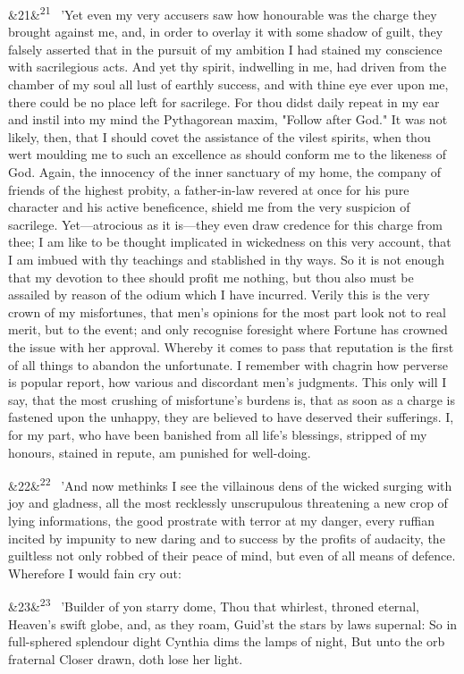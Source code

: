 \documentclass[12pt]{article}
\newcommand{\para}[1][]{\par\noindent\ifx&#1&\else\textsuperscript{\footnotesize #1}~\fi}
\begin{document}
\para[21] 'Yet even my very accusers saw how honourable was the charge they brought against me, and, in order to overlay it with some shadow of guilt, they falsely asserted that in the pursuit of my ambition I had stained my conscience with sacrilegious acts. And yet thy spirit, indwelling in me, had driven from the chamber of my soul all lust of earthly success, and with thine eye ever upon me, there could be no place left for sacrilege. For thou didst daily repeat in my ear and instil into my mind the Pythagorean maxim, "Follow after God." It was not likely, then, that I should covet the assistance of the vilest spirits, when thou wert moulding me to such an excellence as should conform me to the likeness of God. Again, the innocency of the inner sanctuary of my home, the company of friends of the highest probity, a father-in-law revered at once for his pure character and his active beneficence, shield me from the very suspicion of sacrilege. Yet---atrocious as it is---they even draw credence for this charge from thee; I am like to be thought implicated in wickedness on this very account, that I am imbued with thy teachings and stablished in thy ways. So it is not enough that my devotion to thee should profit me nothing, but thou also must be assailed by reason of the odium which I have incurred. Verily this is the very crown of my misfortunes, that men's opinions for the most part look not to real merit, but to the event; and only recognise foresight where Fortune has crowned the issue with her approval. Whereby it comes to pass that reputation is the first of all things to abandon the unfortunate. I remember with chagrin how perverse is popular report, how various and discordant men's judgments. This only will I say, that the most crushing of misfortune's burdens is, that as soon as a charge is fastened upon the unhappy, they are believed to have deserved their sufferings. I, for my part, who have been banished from all life's blessings, stripped of my honours, stained in repute, am punished for well-doing.

\para[22] 'And now methinks I see the villainous dens of the wicked surging with joy and gladness, all the most recklessly unscrupulous threatening a new crop of lying informations, the good prostrate with terror at my danger, every ruffian incited by impunity to new daring and to success by the profits of audacity, the guiltless not only robbed of their peace of mind, but even of all means of defence. Wherefore I would fain cry out:

\para[23] 'Builder of yon starry dome, Thou that whirlest, throned eternal, Heaven's swift globe, and, as they roam, Guid'st the stars by laws supernal: So in full-sphered splendour dight Cynthia dims the lamps of night, But unto the orb fraternal Closer drawn, doth lose her light.
\end{document}
